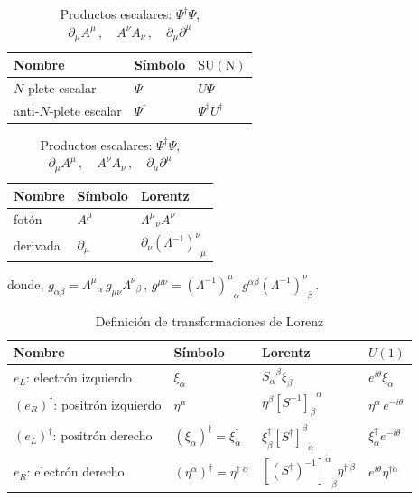 \begin{frame}

\begin{table}
  \centering
   \begin{tabular}{lll}
    Nombre & Símbolo & $\operatorname{SU(N)}$ \\\hline
    $N$-plete escalar & $\Psi$ & $U \Psi$ \\
    anti-$N$-plete escalar & $\Psi^\dagger $ & $\Psi^\dagger U^\dagger $ \\\hline
    \end{tabular}\hspace{3cm}
   \begin{tabular}{lll}
    Nombre & Símbolo & Lorentz \\\hline
    fotón & $A^\mu$ & ${\Lambda^\mu}_\nu A^\nu$ \\
    derivada & $\partial_\mu$ & $\partial_\nu {\left(\Lambda^{-1}\right)^\nu}_\mu$ \\\hline
  \end{tabular}
  \caption{
       Productos escalares: $\Psi^\dagger \Psi$,  \hspace{4cm}
       $\partial_\mu A^{\mu}\,,\quad A^\nu A_\nu \,,\quad \partial_\mu  \partial^\mu$
}
  \label{tab:fermionlr}
\end{table}
donde,
 $g_{\alpha\beta}={\Lambda^{\mu}}_{\alpha}\,g_{\mu\nu}{\Lambda^{\nu}}_{\beta}\,$,
  $g^{\mu\nu}={\left( \Lambda^{-1} \right)^{\mu}}_{\alpha}\,g^{\alpha\beta} {\left( \Lambda^{-1} \right)^{\nu}}_{\beta}\,$.


\begin{table}
  \centering
  \begin{tabular}{llll}
    Nombre & Símbolo & Lorentz & $U(1)$\\\hline\hline
    $e_L$: electrón izquierdo & $\xi_{\alpha}$ & ${S_{\alpha}}^{\beta}\xi_{\beta}$ & $e^{i\theta}\xi_\alpha$\\
   $\left( e_R \right)^{\dagger}$: positrón izquierdo&$\eta^{\alpha}$& $\eta^\beta{\left[  S^{-1}  \right]_{\beta}}^{\alpha}$ & $\eta^\alpha\, e^{-i\theta}$\\
    \hline    
    $\left( e_L \right)^{\dagger}$: positrón derecho   & $\left( \xi_{\alpha} \right)^{\dagger}=\xi^{\dagger}_{\dot{\alpha}}$ &
     $\xi^{\dagger}_{\dot{\beta}}{\left[{S^{\dagger}}\right]^{\dot{\beta}}}_{\dot{\alpha}}$ & $\xi^\dagger_{\dot{\alpha}} e^{-i\theta}$\\
   $e_R$: electrón derecho   & $\left( \eta^{\alpha} \right)^{\dagger}=\eta^{\dagger\;\dot{\alpha}}$ & ${\left[ \left( S^{\dagger} \right)^{-1} \right]^{\dot{\alpha}}}_{\dot{\beta}}\eta^{\dagger\;\dot{\beta}}$& $e^{i\theta}\eta^{\dagger\dot{\alpha}}$ \\\hline\hline
  \end{tabular}
  \caption{Definición de transformaciones de Lorenz}
  \label{tab:fermionlr}
\end{table}




\end{frame}
